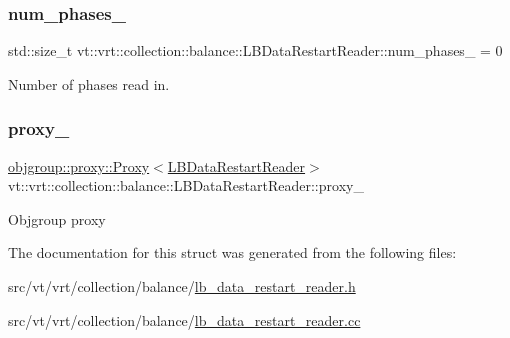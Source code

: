 \subsubsection{\texorpdfstring{num\+\_\+phases\+\_\+}{num\_phases\_}}
{\footnotesize\ttfamily std\+::size\+\_\+t vt\+::vrt\+::collection\+::balance\+::\+L\+B\+Data\+Restart\+Reader\+::num\+\_\+phases\+\_\+ = 0\hspace{0.3cm}{\ttfamily [private]}}



Number of phases read in. 

\mbox{\label{structvt_1_1vrt_1_1collection_1_1balance_1_1_l_b_data_restart_reader_a65b1a0379efca529b3ce6cff045e047a}} 
\subsubsection{\texorpdfstring{proxy\+\_\+}{proxy\_}}
{\footnotesize\ttfamily \hyperlink{structvt_1_1objgroup_1_1proxy_1_1_proxy}{objgroup\+::proxy\+::\+Proxy}$<$\hyperlink{structvt_1_1vrt_1_1collection_1_1balance_1_1_l_b_data_restart_reader}{L\+B\+Data\+Restart\+Reader}$>$ vt\+::vrt\+::collection\+::balance\+::\+L\+B\+Data\+Restart\+Reader\+::proxy\+\_\+\hspace{0.3cm}{\ttfamily [private]}}

Objgroup proxy 

The documentation for this struct was generated from the following files\+:\begin{DoxyCompactItemize}
\item 
src/vt/vrt/collection/balance/\hyperlink{lb__data__restart__reader_8h}{lb\+\_\+data\+\_\+restart\+\_\+reader.\+h}\item 
src/vt/vrt/collection/balance/\hyperlink{lb__data__restart__reader_8cc}{lb\+\_\+data\+\_\+restart\+\_\+reader.\+cc}\end{DoxyCompactItemize}
